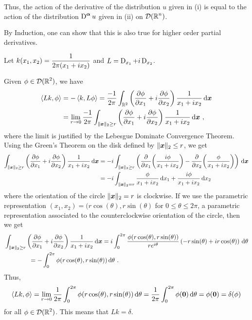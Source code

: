 \begin{egg}
Thus, the action of the derivative of the distribution $u$ given in
(i) is equal to the action of the distribution
$\DS \diff^{\VEC{\alpha}} u$
given in (ii) on $\DS \DD(\RR^n)$.

By Induction, one can show that this is also true for higher order
partial derivatives.
\end{egg}

\begin{egg}
Let $\DS k(x_1,x_2) = \frac{1}{2\pi(x_1 + i x_2)}$ and
$L = \diff_{x_1} + i \diff_{x_2}$.

Given $\DS \phi \in \DD(\RR^2)$, we have
\begin{align*}
\ps{L k}{\phi} &= - \ps{k}{L\phi}
= \frac{-1}{2\pi} \int_{\RR^2} \left( \pdydx{\phi}{x_1} + i
\pdydx{\phi}{x_2} \right) \frac{1}{x_1 + i x_2} \dx{\VEC{x}} \\
&= \lim_{r\to 0} \frac{-1}{2\pi} \int_{\|\VEC{x}\|_2\geq r}
\left( \pdydx{\phi}{x_1} + i \pdydx{\phi}{x_2} \right)
\frac{1}{x_1 + i x_2} \dx{\VEC{x}}  \ ,
\end{align*}
where the limit is justified by the Lebesgue Dominate Convergence
Theorem.  Using the Green's Theorem on the disk defined by
$\DS \|\VEC{x}\|_2 \leq r$, we get
\begin{align*}
\int_{\|\VEC{x}\|_2\geq r}
\left( \pdydx{\phi}{x_1} + i \pdydx{\phi}{x_2} \right) \frac{1}{x_1 + i x_2}
\dx{\VEC{x}}
&= -i \int_{\|\VEC{x}\|_2\geq r}
\left( \pdfdx{\left(\frac{i \phi}{x_1 + i x_2}\right)}{x_1}
- \pdfdx{\left(\frac{\phi}{x_1 + i x_2}\right)}{x_2}  \right) \dx{\VEC{x}} \\
&= -i \int_{\|\VEC{x}\|_2 = r}
\frac{\phi}{x_1 + i x_2} \dx{x_1} + \frac{i\phi}{x_1 + i x_2} \dx{x_2}
\end{align*}
where the orientation of the circle $\|\VEC{x}\|_2 = r$
is clockwise.  If we use the parametric representation
$(x_1,x_2) = (r\cos(\theta),r\sin(\theta)$ for
$0 \leq \theta \leq 2\pi$, a parametric representation associated to
the counterclockwise orientation of the circle, then we get
\begin{align*}
&\int_{\|\VEC{x}\|_2\geq r}
\left( \pdydx{\phi}{x_1} + i \pdydx{\phi}{x_2} \right)
\frac{1}{x_1 + i x_2} \dx{\VEC{x}} 
= i \int_0^{2\pi} \frac{\phi(r\cos(\theta),r\sin(\theta))}{r e^{i \theta}}
\left( -r \sin(\theta) + i r \cos(\theta) \right) \dx{\theta} \\
&\qquad \qquad
= - \int_0^{2\pi} \phi(r\cos(\theta),r\sin(\theta)) \dx{\theta} \ .
\end{align*}
Thus,
\[
\ps{L k}{\phi} = \lim_{r\to 0} \frac{1}{2\pi}
\int_0^{2\pi} \phi(r\cos(\theta),r\sin(\theta)) \dx{\theta}
= \frac{1}{2\pi} \int_0^{2\pi} \phi(\VEC{0}) \dx{\theta}
= \phi(\VEC{0}) = \delta(\phi)
\]
for all $\DS \phi \in \DD(\RR^2)$.  This means that
$L k = \delta$.
\end{egg}

